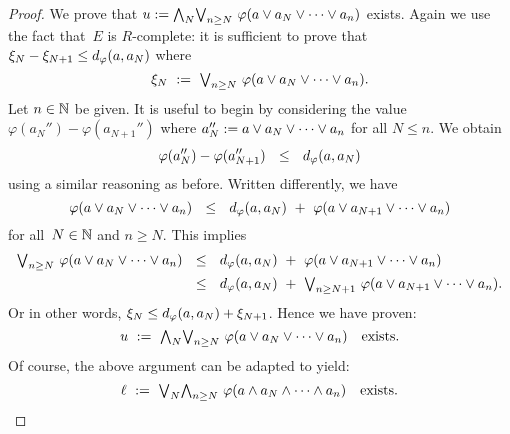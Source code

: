 \documentclass[main.tex]{subfiles}
\begin{document}
\begin{proof}
We prove that $u:= 
\textstyle{\bigwedge}_N \textstyle{\bigvee}_{n\geq N} \ \varphi(a\vee a_N\vee \dotsb \vee a_n)$ exists.
Again we use the fact that~$E$ is $R$-complete:
it is sufficient to prove that $\xi_N - \xi_{N+1} \leq d_{\smash{\varphi}}(a,a_N)$
where 
\begin{equation*}
\xi_N \ :=\  \textstyle{\bigvee}_{n\geq N} \ \varphi(a\vee a_N \vee \dotsb \vee a_n).
\end{equation*}
Let $n\in \mathbb{N}$ be given.
It is useful to begin by  considering the value
$\varphi(a_N'') - \varphi(a_{N+1}'')$
where 
$a_N'':= a\vee a_N \vee \dotsb \vee a_n$
for all $N\leq n$. We obtain
\begin{equation*}
\varphi(a_N'') - \varphi(a_{N+1}'')
\ \ \leq\ \ d_{\smash{\varphi}}(a,a_N)
\end{equation*}
using a similar reasoning as before. 
Written differently, we have
\begin{equation*}
\varphi(a \vee a_N \vee\dotsb\vee a_n) 
\ \ \leq\ \ \ld\varphi(a,a_N) \ +\ 
\varphi(a \vee a_{N+1} \vee \dotsb \vee a_n)
\end{equation*}
for all~$N\in \mathbb{N}$ and $n\geq N$.
This implies
\begin{alignat*}{3}
\bv_{n\geq N}\ \varphi(a \vee a_N \vee\dotsb\vee a_n) 
\ \ &\leq\ \ 
\ld\varphi(a,a_N) \ +\ 
\varphi(a \vee a_{N+1} \vee \dotsb \vee a_n) \\
\ \ &\leq\ \ 
\ld\varphi(a,a_N) \ +\ 
\bv_{n\geq N+1}\ \varphi(a \vee a_{N+1} \vee \dotsb \vee a_n).
\end{alignat*}
Or in other words, $\xi_{N} \leq d_{\smash{\varphi}}(a,a_N) + \xi_{N+1}$.
Hence we have proven:
 \begin{equation*}
u\ \eqdf\ 
\bw_N \bv_{n\geq N} \ \varphi(a\vee a_N\vee \dotsb \vee a_n)
\quad\text{exists.}
\end{equation*}
Of course,
the above argument can be adapted to yield:
 \begin{equation*}
\ell\ \eqdf\ 
\bv_N \bw_{n\geq N} \ \varphi(a\wedge a_N\wedge \dotsb \wedge a_n)
\quad\text{exists.}
\end{equation*}


\end{proof}
\end{document}
